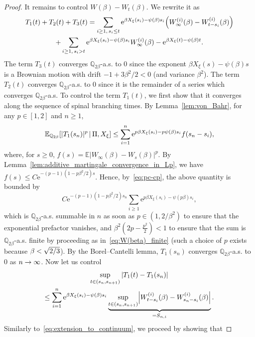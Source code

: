 \documentclass[10pt]{amsart}
\theoremstyle{definition}\newtheorem{defi}[theo]{Definition}\newtheorem{rema}[theo]{Remark}\newtheorem{exam}[theo]{Example}\newtheorem{exem}[theo]{Example}\newtheorem{nota}[theo]{Notation}
\newcommand{\e}{\mathrm{e}}
\newcommand{\E}{\mathbb{E}}
\newcommand{\Q}{\mathbb{Q}}
\newcommand\1{\mathds{1}}
\let\originalleft\left
\let\originalright\right
\renewcommand{\left}{\mathopen{}\mathclose\bgroup\originalleft}
\renewcommand{\right}{\aftergroup\egroup\originalright}
\renewcommand*{\to}{\mathchoice{\longrightarrow}{\rightarrow}{\rightarrow}{\rightarrow}}
\begin{document}
\begin{proof}
It remains to control $W(\beta) - W_t(\beta)$. We rewrite it as
\begin{multline*}
T_1(t) + T_2(t) + T_3(t)  = \sum_{i \geq 1,\, s_i \leq t} \e^{\beta X_\xi(s_i) - \psi(\beta)s_i} \left(W_\infty^{(i)}(\beta) - W_{t - s_i}^{(i)}(\beta)\right) \\
+ \sum_{i \geq 1,\, s_i > t} \e^{\beta X_\xi(s_i) - \psi(\beta)s_i} W_\infty^{(i)}(\beta)- \e^{\beta X_\xi(t) - \psi(\beta)t}. 
\end{multline*}
The term $T_3(t)$ converges $\Q_{2\beta}$-a.s. to $0$ since the exponent $\beta X_\xi(s) - \psi(\beta)s$ is a Brownian motion with drift $-1 + 3\beta^2/2 < 0$ (and variance $\beta^2$). The term $T_2(t)$ converges $\Q_{2\beta}$-a.s. to $0$ since it is the remainder of a series which converges $\Q_{2\beta}$-a.s. To control the term $T_1(t)$, we first show that it converges along the sequence of spinal branching times. By Lemma~\ref{lem:von_Bahr}, for any $p \in [1, 2]$ and $n \geq 1$,
\begin{equation*}
\E_{\Q_{2\beta}} \left[|T_1(s_n)|^p \,\middle|\, \Pi, X_\xi \right] \leq \sum_{i = 1}^n \e^{p \beta X_\xi(s_i) - p \psi(\beta) s_i} f(s_n - s_i),
\end{equation*}
where, for $s \geq 0$, $f(s) = \E|W_\infty(\beta) - W_s(\beta)|^p$. By Lemma~\ref{lem:additive_martingale_convergence_in_Lp}, we have $f(s) \leq C \e^{-(p - 1)(1 - p\beta^2/2)s}$. Hence, by~\eqref{eq:pc-cp}, the above quantity is bounded by
\begin{equation*}
C \e^{-(p - 1)(1 - p\beta^2/2)s_n} \sum_{i \geq 1} \e^{p \beta X_\xi(s_i) - \psi(p \beta) s_i},
\end{equation*}
which is $\Q_{2\beta}$-a.s. summable in $n$ as soon as $p \in (1, 2/\beta^2)$ to ensure that the exponential prefactor vanishes, and $\beta^2 (2p-\frac{p^2}{2}) < 1$ to ensure that the sum is $\Q_{2\beta}$-a.s. finite by proceeding as in~\eqref{eq:W(beta)_finite} (such a choice of $p$ exists because $\beta < \sqrt{2\smash{/}3}$). By the Borel--Cantelli lemma, $T_1(s_n)$ converges $\Q_{2\beta}$-a.s. to $0$ as $n \to \infty$. Now let us control
\begin{multline}\label{eq:T1_extension_to_continuum}
 \sup_{t \in (s_n, s_{n+1})} |T_1(t) - T_1(s_n)| \\
\leq \sum_{i = 1}^n \e^{\beta X_\xi(s_i) - \psi(\beta)s_i} \underbrace{\sup_{t \in (s_n, s_{n+1})} \left| W_{t - s_i}^{(i)}(\beta) - W_{s_n - s_i}^{(i)}(\beta) \right|}_{= S_{n, i}}.
\end{multline}
Similarly to~\eqref{eq:extension_to_continuum}, we proceed by showing that

\end{proof}
\end{document}
